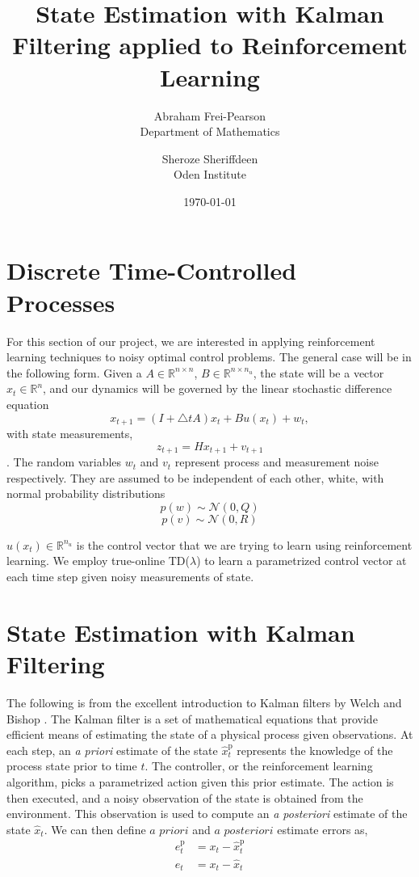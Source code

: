 \documentclass{article}
\title{State Estimation with Kalman Filtering applied to Reinforcement Learning}
\author{Abraham Frei-Pearson \\
	Department of Mathematics  \\
	\and 
	Sheroze Sheriffdeen \\
	Oden Institute \\
	}
\date{\today}
\begin{document}
\maketitle

\section{Discrete Time-Controlled Processes}

For this section of our project, we are interested in applying reinforcement learning techniques to noisy optimal control problems. The general case will be in the following form. Given a $A \in \mathbb{R}^{n \times n}$, $B \in \mathbb{R}^{n \times n_u}$, the state will be a vector $x_t \in \mathbb R^n$, and our dynamics will be governed by the linear stochastic difference equation
\begin{equation}
    x_{t+1} = (I + \triangle t A) x_t + Bu(x_t) + w_t,
    \label{eq:dynamical}
\end{equation}
with state measurements,
\[
	z_{t+1} = H x_{t+1} + v_{t+1}
\].
The random variables $w_t$ and $v_t$ represent process and measurement noise respectively. They are assumed to be independent of each other, white, with normal probability distributions
\[ 
p(w) \sim \mathcal{N}(0, Q)
\]
\[
p(v) \sim \mathcal{N}(0, R)
\]

$u(x_t) \in \mathbb{R}^{n_u}$ is the control vector that we are trying to learn using reinforcement learning. We employ true-online TD($\lambda$) to learn a parametrized control vector at each time step given noisy measurements of state.

\section{State Estimation with Kalman Filtering}

The following is from the excellent introduction to Kalman filters by Welch and Bishop \cite{welch1995introduction}. The Kalman filter is a set of mathematical equations that provide efficient means of estimating the state of a physical process given observations. At each step, an \textit{a priori} estimate of the state $\hat{x}_{t}^{\text{p}}$ represents the knowledge of the process state prior to time $t$. The controller, or the reinforcement learning algorithm, picks a parametrized action given this prior estimate. The action is then executed, and a noisy observation of the state is obtained from the environment. This observation is used to compute an \textit{a posteriori} estimate of the state $\hat{x}_{t}$. We can then define $\textit{a priori}$ and $\textit{a posteriori}$ estimate errors as,
\begin{align*}
	e^{\text{p}}_t &= x_t - \hat{x}_{t}^{\text{p}} \\
	e_t &= x_t - \hat{x}_{t} 
\end{align*}
\end{document}
